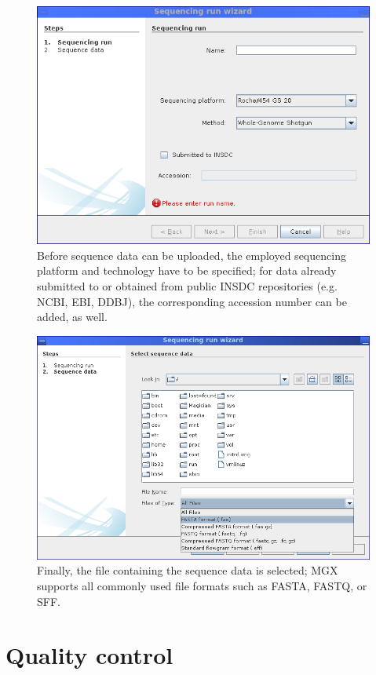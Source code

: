 \begin{figure}[H]
\centering
\includegraphics[width=.8\textwidth]{img/mgx/runwiz1}
\caption[Sequence import]{Before sequence data can be uploaded, the employed sequencing platform and technology have 
to be specified; for data already submitted to or obtained from public INSDC repositories (e.g. NCBI, EBI, DDBJ), the
corresponding accession number can be added, as well.}
\label{dnawiz1}
\end{figure}

\begin{figure}[H]
\centering
\includegraphics[width=.8\textwidth]{img/mgx/runwiz2}
\caption[Sequence import]{Finally, the file containing the sequence data is selected; MGX supports all commonly used
file formats such as FASTA, FASTQ, or SFF.}
\label{dnawiz2}
\end{figure}

\section{Quality control}

